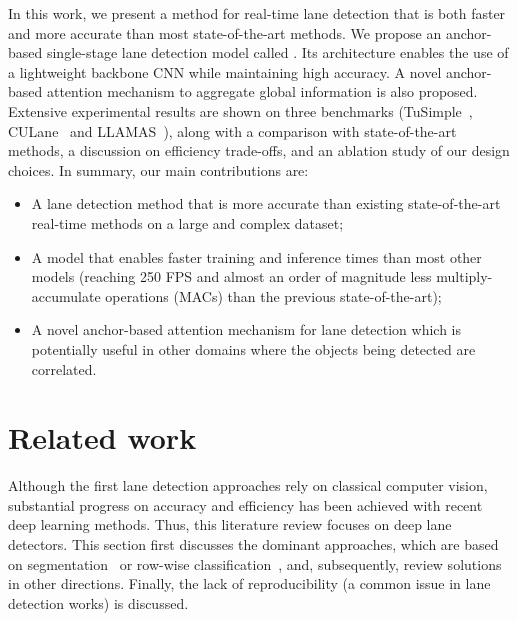 \documentclass[final]{cvpr}
\begin{document}
In this work, we present a method for real-time lane detection that is both faster and more accurate than most state-of-the-art methods. We propose an anchor-based single-stage lane detection model called \methodname. Its architecture enables the use of a lightweight backbone CNN while maintaining high accuracy. A novel anchor-based attention mechanism to aggregate global information is also proposed. Extensive experimental results are shown on three benchmarks (TuSimple~\cite{tusimple}, CULane~\cite{scnn} and LLAMAS~\cite{llamas}), along with a comparison with state-of-the-art methods, a discussion on efficiency trade-offs, and an ablation study of our design choices. In summary, our main contributions are:

\begin{itemize}
    \item A lane detection method that is more accurate than existing state-of-the-art real-time methods on a large and complex dataset;
    \item A model that enables faster training and inference times than most other models (reaching 250 FPS and almost an order of magnitude less multiply-accumulate operations (MACs) than the previous state-of-the-art);
    \item A novel anchor-based attention mechanism for lane detection which is potentially useful in other domains where the objects being detected are correlated.
\end{itemize}

 \section{Related work}

Although the first lane detection approaches rely on classical computer vision, substantial progress on accuracy and efficiency has been achieved with recent deep learning methods. Thus, this literature review focuses on deep lane detectors. This section first discusses the dominant approaches, which are based on segmentation~\cite{scnn,enet-sad,unetconvlstm,sim-cyclegan} or row-wise classification~\cite{intrakd,ufsa,e2e-lmd}, and, subsequently, review solutions in other directions. Finally, the lack of reproducibility (a common issue in lane detection works) is discussed.
\end{document}
